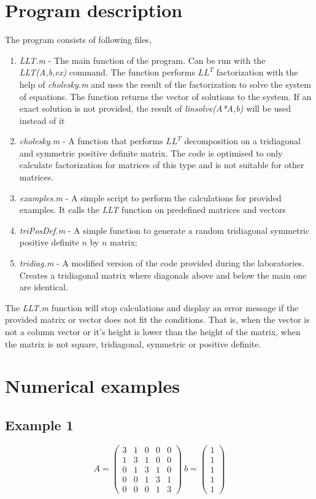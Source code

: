 \documentclass[12pt]{article}
\begin{document}
\section{Program description}
The program consists of following files,
\begin{enumerate}
\item \textit{LLT.m} - The main function of the program. Can be run with the \textit{LLT(A,b,ex)} command. The function performs $LL^T$ factorization with the help of \textit{cholesky.m} and uses the result of the factorization to solve the system of equations. The function returns the vector of solutions to the system. If an exact solution is not provided, the result of \textit{linsolve(A*A,b)} will be used instead of it
\item \textit{cholesky.m} - A function that performs $LL^T$ decomposition on a tridiagonal and symmetric positive definite matrix. The code is optimised to only calculate factorization for matrices of this type and is not suitable for other matrices.
\item \textit{examples.m} - A simple script to perform the calculations for provided examples. It calls the \textit{LLT} function on predefined matrices and vectors
\item \textit{triPosDef.m} - A simple function to generate a random tridiagonal symmetric 
positive definite $n$ by $n$ matrix;
\item \textit{tridiag.m} - A modified version of the code provided during the laboratories. Creates a tridiagonal matrix where diagonals above and below the main one are identical.
\end{enumerate}
The \textit{LLT.m} function will stop calculations and display an error message if the provided matrix or vector does not fit the conditions. That is, when the vector is not a column vector or it's height is lower than the height of the matrix, when the matrix is not square, tridiagonal, symmetric or positive definite.

\section{Numerical examples}
\subsection{Example 1}
$$A = \left(\begin{array}{ccccc} 3 & 1 & 0 & 0 & 0\\ 1 & 3 & 1 & 0 & 0\\ 0 & 1 & 3 & 1 & 0\\ 0 & 0 & 1 & 3 & 1\\ 0 & 0 & 0 & 1 & 3 \end{array}\right)\ 
b = \left(\begin{array}{c} 1\\ 1\\ 1\\ 1\\ 1 \end{array}\right)$$
\end{document}
